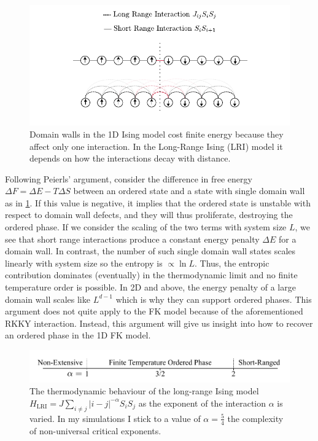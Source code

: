 \hypertarget{fig:ising_model_domain_wall}{%
\begin{figure}
\centering
\includegraphics[width=1\textwidth,height=\textheight]{figure_code/intro_chapter/ising_model_domain_wall}
\caption[{Domain walls in the long-range Ising Model}]{Domain walls in the 1D Ising model cost finite energy because they affect only one interaction. In the Long-Range Ising (LRI) model it depends on how the interactions decay with distance.}
\label{fig:ising_model_domain_wall}
\end{figure}
}

Following Peierls' argument, consider the difference in free energy \(\Delta F = \Delta E - T\Delta S\) between an ordered state and a state with single domain wall as in \cref{fig:ising_model_domain_wall}. If this value is negative, it implies that the ordered state is unstable with respect to domain wall defects, and they will thus proliferate, destroying the ordered phase. If we consider the scaling of the two terms with system size \(L\), we see that short range interactions produce a constant energy penalty \(\Delta E\) for a domain wall. In contrast, the number of such single domain wall states scales linearly with system size so the entropy is \(\propto \ln L\). Thus, the entropic contribution dominates (eventually) in the thermodynamic limit and no finite temperature order is possible. In 2D and above, the energy penalty of a large domain wall scales like \(L^{d-1}\) which is why they can support ordered phases. This argument does not quite apply to the FK model because of the aforementioned RKKY interaction. Instead, this argument will give us insight into how to recover an ordered phase in the 1D FK model.

\hypertarget{fig:alpha_diagram}{%
\begin{figure}
\centering
\includegraphics[width=1\textwidth,height=\textheight]{figure_code/background_chapter/alpha_diagram}
\caption[{Long-Range Ising Model Behaviour}]{The thermodynamic behaviour of the long-range Ising model \(H_{\mathrm{LRI}} = J \sum_{i\neq j} |i - j|^{-\alpha} S_i S_j\) as the exponent of the interaction \(\alpha\) is varied. In my simulations I stick to a value of \(\alpha = \tfrac{5}{4}\) the complexity of non-universal critical exponents.}
\label{fig:alpha_diagram}
\end{figure}
}

